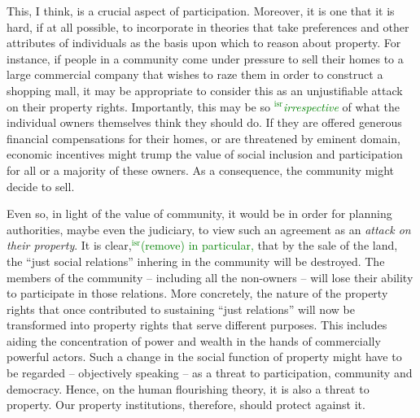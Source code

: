 \documentclass[12pt,a4paper]{book} %
\newcommand{\isr}[1]{\textcolor{green}{$^{\textrm{isr}}${#1}}}
\begin{document}
This, I think, is a crucial aspect of participation. Moreover, it is one that it is hard, if at all possible, to incorporate in theories that take  preferences and other attributes of individuals as the basis upon which to reason about property. For instance, if people in a community come under pressure to sell their homes to a large commercial company that wishes to raze them in order to construct a shopping mall, it may be appropriate to consider this as an unjustifiable attack on their property rights. Importantly, this may be so \isr{{\it irrespective}} of what the individual owners themselves think they should do. If they are offered generous financial compensations for their homes, or are threatened by eminent domain, economic incentives might trump the value of social inclusion and participation for all or a majority of these owners. As a consequence, the community might decide to sell.  

Even so, in light of the value of community, it would be in order for planning authorities, maybe even the judiciary, to view such an  agreement as an {\it attack on their property}. It is clear,\isr{(remove) in particular,} that by the sale of the land, the ``just social relations'' inhering in the community will be destroyed. The members of the community -- including all the non-owners -- will lose their ability to participate in those relations. More concretely, the nature of the property rights that once contributed to sustaining ``just relations'' will now be transformed into property rights that serve different purposes. This includes aiding the concentration of power and wealth in the hands of commercially powerful actors. Such a change in the social function of property might have to be regarded -- objectively speaking -- as a threat to participation, community and democracy. Hence, on the human flourishing theory, it is also a threat to property. Our property institutions, therefore, should protect against it.
\end{document}

